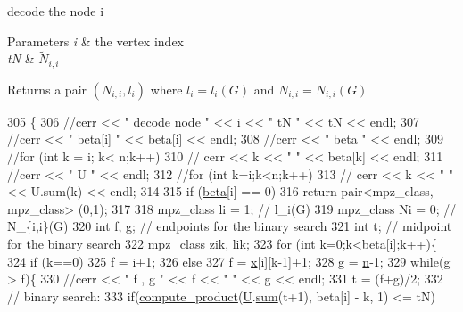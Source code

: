 decode the node i 


\begin{DoxyParams}{Parameters}
{\em i} & the vertex index \\
\hline
{\em tN} & $\tilde{N}_{i,i}$ \\
\hline
\end{DoxyParams}
\begin{DoxyReturn}{Returns}
a pair $(N_{i,i}, l_i)$ where $l_i = l_i(G)$ and $N_{i,i} = N_{i,i}(G)$ 
\end{DoxyReturn}

\begin{DoxyCode}
305 \{
306   \textcolor{comment}{//cerr << " decode node " << i << " tN " << tN << endl;}
307   \textcolor{comment}{//cerr << " beta[i] " << beta[i] << endl;}
308   \textcolor{comment}{//cerr << " beta " << endl;}
309   \textcolor{comment}{//for (int k = i; k< n;k++)}
310   \textcolor{comment}{//  cerr << k << " " << beta[k] << endl;}
311   \textcolor{comment}{//cerr << " U " << endl;}
312   \textcolor{comment}{//for (int k=i;k<n;k++)}
313   \textcolor{comment}{//  cerr << k << " " << U.sum(k) << endl;}
314 
315   \textcolor{keywordflow}{if} (\hyperlink{classgraph__decoder_aa57c11e4c09c52101682ff83286162f7}{beta}[i] == 0)
316     \textcolor{keywordflow}{return} pair<mpz\_class, mpz\_class> (0,1);
317 
318   mpz\_class li = 1; \textcolor{comment}{// l\_i(G)}
319   mpz\_class Ni = 0; \textcolor{comment}{// N\_\{i,i\}(G)}
320   \textcolor{keywordtype}{int} f, g; \textcolor{comment}{// endpoints for the binary search}
321   \textcolor{keywordtype}{int} t; \textcolor{comment}{// midpoint for the binary search}
322   mpz\_class zik, lik; 
323   \textcolor{keywordflow}{for} (\textcolor{keywordtype}{int} k=0;k<\hyperlink{classgraph__decoder_aa57c11e4c09c52101682ff83286162f7}{beta}[i];k++)\{
324     \textcolor{keywordflow}{if} (k==0)
325       f = i+1;
326     \textcolor{keywordflow}{else}
327       f = \hyperlink{classgraph__decoder_aa3f2776afe387668cf7f68109428e14e}{x}[i][k-1]+1;
328     g = \hyperlink{classgraph__decoder_a6bc1e72b2f7a913d14b789a6c2d92c1e}{n}-1;
329     \textcolor{keywordflow}{while}(g > f)\{
330       \textcolor{comment}{//cerr << " f , g " << f << " " << g << endl;}
331       t = (f+g)/2;
332       \textcolor{comment}{// binary search:}
333       \textcolor{keywordflow}{if}(\hyperlink{compression__helper_8cpp_ae2afb43aabe50f7d42aae8f82b5a35f4}{compute\_product}(\hyperlink{classgraph__decoder_a2fa9fec2cef06aaa410e57fb59d5c1ad}{U}.\hyperlink{classreverse__fenwick__tree_a672731fd6395b4853430073a099a80e6}{sum}(t+1), beta[i] - k, 1) <= tN)

\end{DoxyCode}
